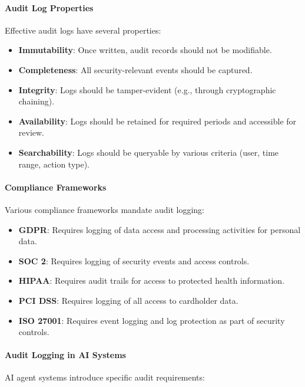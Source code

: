 \paragraph{Audit Log Properties}

Effective audit logs have several properties:

\begin{itemize}
    \item \textbf{Immutability}: Once written, audit records should not be modifiable.
    \item \textbf{Completeness}: All security-relevant events should be captured.
    \item \textbf{Integrity}: Logs should be tamper-evident (e.g., through cryptographic chaining).
    \item \textbf{Availability}: Logs should be retained for required periods and accessible for review.
    \item \textbf{Searchability}: Logs should be queryable by various criteria (user, time range, action type).
\end{itemize}

\paragraph{Compliance Frameworks}

Various compliance frameworks mandate audit logging:

\begin{itemize}
    \item \textbf{GDPR}: Requires logging of data access and processing activities for personal data.
    \item \textbf{SOC 2}: Requires logging of security events and access controls.
    \item \textbf{HIPAA}: Requires audit trails for access to protected health information.
    \item \textbf{PCI DSS}: Requires logging of all access to cardholder data.
    \item \textbf{ISO 27001}: Requires event logging and log protection as part of security controls.
\end{itemize}

\paragraph{Audit Logging in AI Systems}

AI agent systems introduce specific audit requirements:


